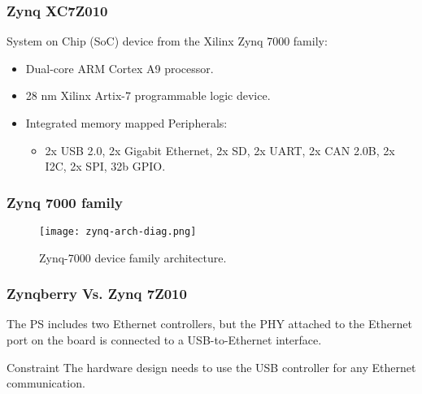 \begin{frame}
	\frametitle{Zynq XC7Z010}
	System on Chip (SoC) device from the Xilinx Zynq 7000 family: \pause
	\begin{itemize}
		\item Dual-core ARM Cortex A9 processor. \pause
		\item 28 nm Xilinx Artix-7 programmable logic device. \pause
		\item Integrated memory mapped Peripherals:
		\begin{itemize}
			\item 2x USB 2.0, 2x Gigabit Ethernet, 2x SD, 2x UART, 2x CAN 2.0B, 2x I2C, 2x SPI, 32b GPIO.
		\end{itemize}
	\end{itemize}
\end{frame}

\begin{frame}
	\frametitle{Zynq 7000 family}
	\begin{figure}
		\texttt{[image: zynq-arch-diag.png]}
		\caption{Zynq-7000 device family architecture.}\label{fig:zynq-arch-diag}
	\end{figure}
\end{frame}

\begin{frame}
	\frametitle{Zynqberry Vs. Zynq 7Z010}
	The PS includes two Ethernet controllers, but the PHY attached to the Ethernet port on the board is connected to a USB-to-Ethernet interface.
	\vfill \pause
	\begin{alertblock}{Constraint}
		The hardware design needs to use the USB controller for any Ethernet communication.
	\end{alertblock}
\end{frame}